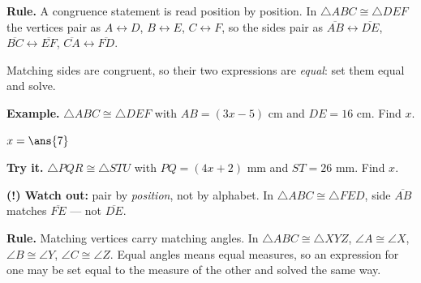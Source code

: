 \documentclass[12pt]{article}
\begin{document}


\begin{formulabox}
\textbf{Rule.} A congruence statement is read position by position. In
$\triangle ABC \cong \triangle DEF$ the vertices pair as $A \leftrightarrow D$,
$B \leftrightarrow E$, $C \leftrightarrow F$, so the sides pair as
$\overline{AB} \leftrightarrow \overline{DE}$,
$\overline{BC} \leftrightarrow \overline{EF}$,
$\overline{CA} \leftrightarrow \overline{FD}$.\par
Matching sides are congruent, so their two expressions are \emph{equal}: set
them equal and solve.
\end{formulabox}

\begin{examplebox}
\textbf{Example.} $\triangle ABC \cong \triangle DEF$ with $AB = (3x-5)$ cm and
$DE = 16$ cm. Find $x$.

$x = \ans{7}$
\end{examplebox}

\begin{tryitbox}
\textbf{Try it.} $\triangle PQR \cong \triangle STU$ with $PQ = (4x+2)$ mm and
$ST = 26$ mm. Find $x$.\\[2pt]
\end{tryitbox}

\begin{watchoutbox}
\textbf{(!) Watch out:} pair by \emph{position}, not by alphabet. In
$\triangle ABC \cong \triangle FED$, side $\overline{AB}$ matches
$\overline{FE}$ --- not $\overline{DE}$.
\end{watchoutbox}


\begin{formulabox}
\textbf{Rule.} Matching vertices carry matching angles. In
$\triangle ABC \cong \triangle XYZ$,
$\angle A \cong \angle X$, $\angle B \cong \angle Y$, $\angle C \cong \angle Z$.
Equal angles means equal measures, so an expression for one may be set equal to
the measure of the other and solved the same way.
\end{formulabox}
\end{document}
